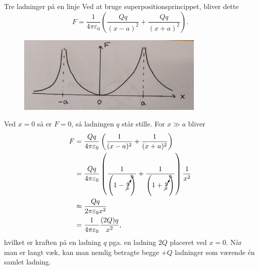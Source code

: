 \begin{opgave}{Tre ladninger på en linje}
    \opg Ved at bruge superpositionsprincippet, bliver dette
    \[ F=\frac{1}{4\pi\varepsilon_0}\left(\frac{Qq}{(x-a)^2}+\frac{Qq}{(x+a)^2}\right). \]
    \opg
    \begin{figure}[H]
        \centering
        \includegraphics[width=0.8\textwidth]{facit/figurer/elektro/elektro_opg3,2.jpg}
    \end{figure}
    \opg Ved $x=0$ så er $F=0$, så ladningen $q$ står stille.
    \opg For $x\gg a$ bliver
    \begin{align*}
        F&=\frac{Qq}{4\pi\varepsilon_0}\left(\frac{1}{(x-a)^2}+\frac{1}{(x+a)^2}\right)\\
        &=\frac{Qq}{4\pi\varepsilon_0}\left(\frac{1}{\left(1-\cancelto{0}{\frac{a}{x}}\right)}+\frac{1}{\left(1+\cancelto{0}{\frac{a}{x}}\right)}\right)\frac{1}{x^2}\\
        &\approx \frac{Qq}{2\pi\varepsilon_0 x^2}\\
        &=\frac{1}{4\pi\varepsilon_0}\frac{(2Q)q}{x^2},
    \end{align*}
    hvilket er kraften på en ladning $q$ pga. en ladning $2Q$ placeret ved $x=0$. Når man er langt væk, kan man nemlig betragte begge $+Q$ ladninger som værende én samlet ladning.
\end{opgave}


